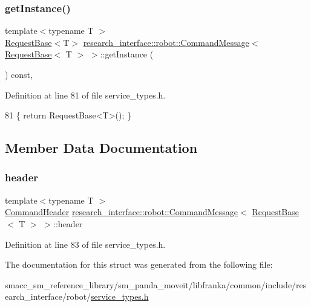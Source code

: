 \subsubsection{\texorpdfstring{get\+Instance()}{getInstance()}}
{\footnotesize\ttfamily template$<$typename T $>$ \\
\hyperlink{structresearch__interface_1_1robot_1_1RequestBase}{Request\+Base}$<$T$>$ \hyperlink{structresearch__interface_1_1robot_1_1CommandMessage}{research\+\_\+interface\+::robot\+::\+Command\+Message}$<$ \hyperlink{structresearch__interface_1_1robot_1_1RequestBase}{Request\+Base}$<$ T $>$ $>$\+::get\+Instance (\begin{DoxyParamCaption}{ }\end{DoxyParamCaption}) const\hspace{0.3cm}{\ttfamily [inline]}, {\ttfamily [noexcept]}}



Definition at line 81 of file service\+\_\+types.\+h.


\begin{DoxyCode}
81 \{ \textcolor{keywordflow}{return} RequestBase<T>(); \}
\end{DoxyCode}


\subsection{Member Data Documentation}
\mbox{\label{structresearch__interface_1_1robot_1_1CommandMessage_3_01RequestBase_3_01T_01_4_01_4_a67abaf5eb91f48562dadd45a760d0083}} 
\subsubsection{\texorpdfstring{header}{header}}
{\footnotesize\ttfamily template$<$typename T $>$ \\
\hyperlink{structresearch__interface_1_1robot_1_1CommandHeader}{Command\+Header} \hyperlink{structresearch__interface_1_1robot_1_1CommandMessage}{research\+\_\+interface\+::robot\+::\+Command\+Message}$<$ \hyperlink{structresearch__interface_1_1robot_1_1RequestBase}{Request\+Base}$<$ T $>$ $>$\+::header}



Definition at line 83 of file service\+\_\+types.\+h.



The documentation for this struct was generated from the following file\+:\begin{DoxyCompactItemize}
\item 
smacc\+\_\+sm\+\_\+reference\+\_\+library/sm\+\_\+panda\+\_\+moveit/libfranka/common/include/research\+\_\+interface/robot/\hyperlink{service__types_8h}{service\+\_\+types.\+h}\end{DoxyCompactItemize}
